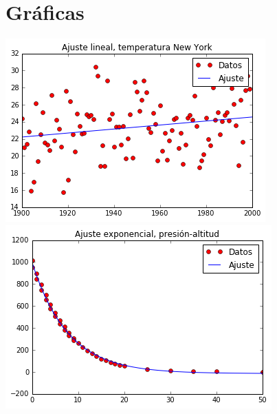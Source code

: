\documentclass[11pt,spanish]{article}
\begin{document}
\section*{Gráficas}

\centering


\includegraphics{graph1}\\
\includegraphics{graph2}\\
\end{document}
